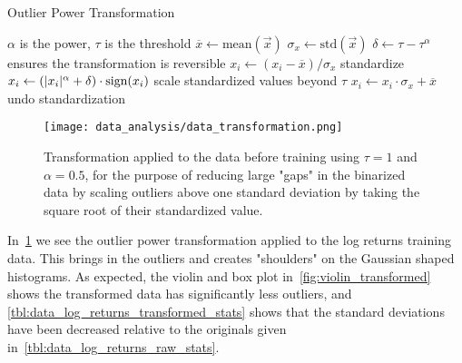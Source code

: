 \begin{algorithm}
    \caption{Outlier Power Transformation}
\begin{algorithmic}[1]
            \Comment $\alpha$ is the power, $\tau$ is the threshold
        \State $\overline{x} \gets \text{mean}(\vec{x})$
        \State $\sigma_{x} \gets \text{std}(\vec{x})$
        \State $\delta \gets \tau - \tau^\alpha$
            \Comment ensures the transformation is reversible
            \State $x_i \gets (x_i - \overline{x}) / \sigma_x$
                \Comment standardize
                \State $x_i \gets (\lvert x_i\rvert^\alpha + \delta) \cdot \text{sign}(x_i)$
                    \Comment scale standardized values beyond $\tau$
            \EndIf
            \State $x_i \gets x_i \cdot \sigma_x + \overline{x}$
                \Comment undo standardization
        \EndFor
    \EndProcedure
\end{algorithmic}
\label{alg:transformation}
\end{algorithm}

\begin{figure}[!htb]
    \begin{center}
        \texttt{[image: data\_analysis/data\_transformation.png]}
    \end{center}
    \caption{Transformation applied to the data before training using \( \tau = 1 \) and \( \alpha = 0.5 \), for the purpose of reducing large "gaps" in the binarized data by scaling outliers above one standard deviation by taking the square root of their standardized value.}
    \label{fig:data_transformation}
\end{figure}

In~\cref{fig:data_transformation} we see the outlier power transformation applied to the log returns training data.
This brings in the outliers and creates "shoulders" on the Gaussian shaped histograms.
As expected, the violin and box plot in~\cref{fig:violin_transformed} shows the transformed data has significantly less outliers, and \cref{tbl:data_log_returns_transformed_stats} shows that the standard deviations have been decreased relative to the originals given in~\cref{tbl:data_log_returns_raw_stats}.

